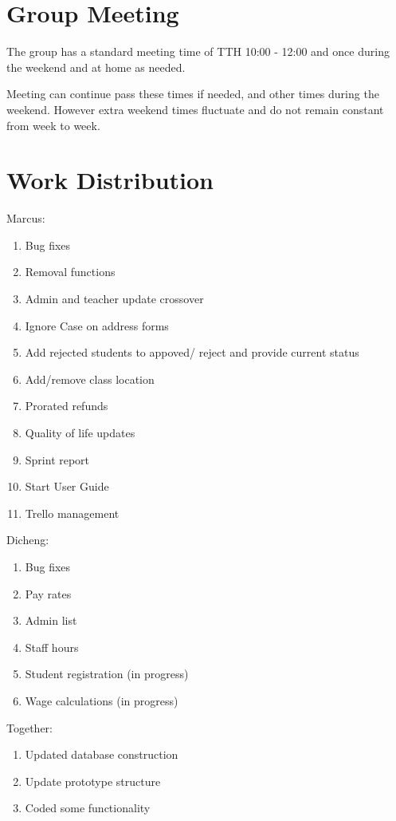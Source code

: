 \documentclass[11pt]{book}
\begin{document}
\section{Group Meeting}

The group has a standard meeting time of TTH 10:00 - 12:00 and once during the weekend and at home as needed.  

Meeting can continue pass these times if needed, and other times during the weekend. However extra weekend times fluctuate and do not remain constant from week to week. 

\section{Work Distribution}

Marcus:
\begin{enumerate}
\item Bug fixes
\item Removal functions
\item Admin and teacher update crossover
\item Ignore Case on address forms
\item Add rejected students to appoved/ reject and provide current status
\item Add/remove class location
\item Prorated refunds
\item Quality of life updates
\item Sprint report
\item Start User Guide
\item Trello management\\
\end{enumerate}

Dicheng:
\begin{enumerate}
\item Bug fixes
\item Pay rates
\item Admin list
\item Staff hours
\item Student registration (in progress)
\item Wage calculations (in progress)
\end{enumerate}


Together:
\begin{enumerate}
\item Updated database construction
\item Update prototype structure
\item Coded some functionality
\end{enumerate}
\end{document}
